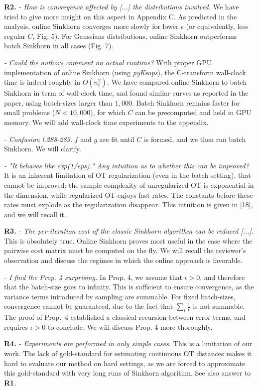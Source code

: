 \documentclass{article}
\begin{document}
\textbf{R2.} \textit{- How is convergence affected by [...] the distributions involved.} We have tried to give more insight on this aspect in Appendix C. As predicted in the analysis, online Sinkhorn converges more slowly for lower $\epsilon$ (or equivalently, less regular $C$, Fig. 5). For Gaussians distributions, online Sinkhorn outperforms batch Sinkhorn in all cases (Fig. 7).

\textit{- Could the authors comment on actual runtime?} With proper GPU
implementation of online Sinkhorn (using \textit{pyKeops}), the C-transform wall-clock time is indeed roughly in $O(n_t^2) $. We have compared
online Sinkhorn to batch Sinkhorn in term of wall-clock time, and found similar
curves as reported in the paper, using batch-sizes larger than $1,000$. Batch Sinkhorn
remains faster for small problems ($N < 10,000$), for which $C$ can be precomputed and
held in GPU memory. We will add wall-clock time experiments to the appendix.

\textit{- Confusion l.288-289.} $f$ and $g$ are fit until $C$ is formed, and we then run batch Sinkhorn. We will clarify.

\textit{- "It behaves like exp(1/eps)." Any intuition as to whether this can be improved?}
It is an inherent limitation of OT regularization (even in the batch setting), that cannot be improved: the sample complexity of unregularized OT is exponential in the dimension, while regularized OT enjoys fast rates. The constants before these rates must explode as the regularization disappear. This intuition is given in [18], and we will recall it.

\textbf{R3.} 
\textit{- The per-iteration cost of the classic Sinkhorn algorithm can
be reduced [...].} This is
absolutely true. Online Sinkhorn proves most useful in the case where the
pairwise cost matrix must be computed on the fly. We will recall the reviewer's observation and discuss the regimes in which the online approach is favorable.

\textit{- I find the Prop. 4 surprising.} In Prop. 4, we assume that $\iota > 0$,
and therefore that the batch-size goes to infinity. This is sufficient to ensure
convergence, as the variance terms introduced by sampling are summable. For
fixed batch-sizes, convergence cannot be guaranteed, due to the fact that
$\sum_t \frac{1}{t}$ is not summable. The proof of Prop.~4 established a
classical recursion between error terms, and requires $\iota > 0$ to conclude.
We will discuss Prop. 4 more thoroughly.

\textbf{R4.} \textit{- Experiments are performed in only simple cases.} This is a limitation of our work. The lack of gold-standard for estimating continuous OT distances makes it hard to evaluate our method on hard settings, as we are forced to approximate this gold-standard with very long runs of Sinkhorn algorithm. See also answer to \textbf{R1}.
\end{document}
